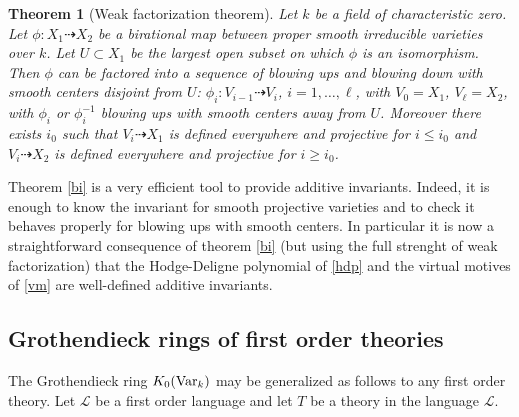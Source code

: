 \documentclass[english,12pt]{amsart}
\let\cal\mathcal
\def\cL{{\mathcal L}}
\newtheorem{theorem}[subsubsection]{Theorem}
\theoremstyle{definition}
\theoremstyle{remark}
\theoremstyle{plain}
\numberwithin{equation}{subsection}
\let\cal\mathcal
\def\cL{{\mathcal L}}
\begin{document}
\begin{theorem}[Weak factorization theorem]\label{wft}
Let $k$ be a field of characteristic zero.
Let $\phi : X_1 \dashrightarrow X_2$
be a birational map
between proper smooth irreducible varieties over $k$. Let $U \subset X_1$ 
be the largest open subset
on which $\phi$ is an isomorphism.
Then $\phi$ can be factored into a sequence of blowing
ups and blowing down
with smooth centers disjoint from $U$:
$\phi_i : V_{i - 1}\dashrightarrow V_i$, $i = 1, \dots, \ell$,
with $V_0 = X_1$, $V_{\ell} = X_2$,
with $\phi_i$ or $\phi_i^{-1}$ blowing ups with smooth centers away from $U$.
Moreover there exists $i_0$ such that
$V_i \dashrightarrow X_1$ is defined everywhere and projective for $i \leq i_0$
and
$V_i \dashrightarrow X_2$ is defined everywhere and projective for $i \geq i_0$.
\end{theorem}

Theorem \ref{bi} is a  very efficient  tool to provide
additive invariants. Indeed, it is enough to know the invariant for smooth projective
varieties and to check it behaves properly for blowing
ups with smooth centers. In particular it is now a straightforward
consequence of theorem \ref{bi}
(but using the full
strenght of weak factorization)
that the Hodge-Deligne polynomial
of
\ref{hdp} and the virtual motives of \ref{vm}
are well-defined additive invariants. 





\subsection{Grothendieck rings of first order theories}\label{g1t}The Grothendieck ring
$K_0 ({\rm Var}_k)$ may be generalized as follows to any
first order theory.
Let $\cL$ be a first order language and let $T$ be a theory in the
language 
$\cal L$.
\end{document}

